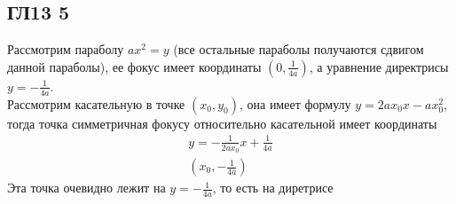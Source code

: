 \subsection*{ГЛ13 5}
Рассмотрим параболу $ax^2 = y$ (все остальные параболы получаются сдвигом данной параболы), ее фокус имеет координаты $(0, \frac{1}{4a})$, а уравнение директрисы $y = -\frac{1}{4a}$.\\
Рассмотрим касательную в точке $(x_0,y_0)$, она имеет формулу $y = 2ax_0x - ax_0^2$, тогда точка симметричная фокусу относительно касательной имеет координаты
\begin{gather*}
	y = -\frac{1}{2ax_0}x + \frac{1}{4a}\\
	(x_0, -\frac{1}{4a})
\end{gather*}
Эта точка очевидно лежит на $y = -\frac{1}{4a}$, то есть на диретрисе 
	